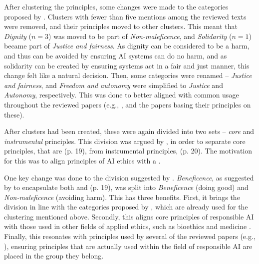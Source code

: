 After clustering the principles, some changes were made to the categories proposed by \textcite{Ryan_2021}. Clusters with fewer than five mentions among the reviewed texts were removed, and their principles moved to other clusters. This meant that \textit{Dignity} ($n = 3$) was moved to be part of \textit{Non-maleficence}, and \textit{Solidarity} ($n = 1$) became part of \textit{Justice and fairness}. As dignity can be considered to be a harm, and thus can be avoided by ensuring AI systems can do no harm, and as solidarity can be created by ensuring systems act in a fair and just manner, this change felt like a natural decision. Then, some categories were renamed -- \textit{Justice and fairness}, and \textit{Freedom and autonomy} were simplified to \textit{Justice} and \textit{Autonomy}, respectively. This was done to better aligned with common usage throughout the reviewed papers (e.g., \cite{Balagué_2021,Floridi_2018}, and the papers basing their principles on these). 

After clusters had been created, these were again divided into two sets -- \emph{core} and \emph{instrumental} principles. This division was argued by \textcite{Canca_2020}, in order to separate core principles, that are  (p. 19), from instrumental principles,  (p. 20). The motivation for this was to align principles of AI ethics with a  \parencite[p. 19]{Canca_2020}.

One key change was done to the division suggested by \textcite{Canca_2020}. \textit{Beneficence}, as suggested by \textcite{Canca_2020} to encapsulate both  and  (p. 19), was split into \textit{Beneficence} (doing good) and \textit{Non-maleficence} (avoiding harm). This has three benefits. First, it brings the division in line with the categories proposed by \textcite{Ryan_2021}, which are already used for the clustering mentioned above. Secondly, this aligns core principles of responsible AI with those used in other fields of applied ethics, such as bioethics \parencite{Beauchamp_2001} and medicine \parencite{Gillon_2003,Gillon_1994}. Finally, this resonates with principles used by several of the reviewed papers (e.g., \cite{Balagué_2021,Floridi_2018,Jobin_2019,Nauck_2019}), ensuring principles that are actually used within the field of responsible AI are placed in the group they belong.


